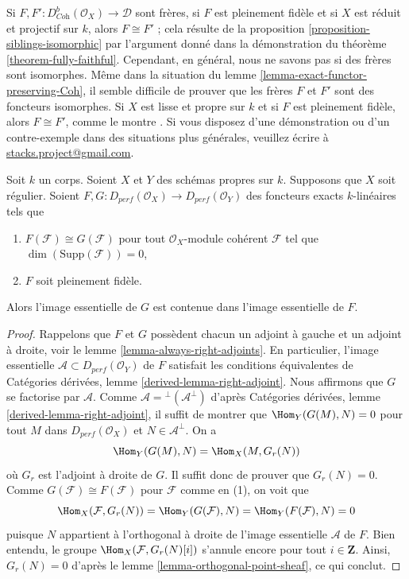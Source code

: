 \begin{remark}
\label{remark-difficult}
Si $F, F' : D^b_{\textit{Coh}}(\mathcal{O}_X) \to \mathcal{D}$ sont frères, si $F$
est pleinement fidèle et si $X$ est réduit et projectif sur $k$, alors
$F \cong F'$ ; cela résulte de la
proposition \ref{proposition-siblings-isomorphic} par l'argument
donné dans la démonstration du théorème \ref{theorem-fully-faithful}.
Cependant, en général, nous ne savons pas si des frères sont isomorphes.
Même dans la situation du lemme \ref{lemma-exact-functor-preserving-Coh},
il semble difficile de prouver que les frères $F$ et $F'$
sont des foncteurs isomorphes. Si $X$ est lisse et propre sur $k$
et si $F$ est pleinement fidèle, alors $F \cong F'$, comme le montre
\cite{Noah}.
Si vous disposez d'une démonstration ou d'un contre-exemple dans des situations plus générales,
veuillez écrire à
\href{mailto:stacks.project@gmail.com}{stacks.project@gmail.com}.
\end{remark}

\begin{lemma}
\label{lemma-two-functors-pre}
Soit $k$ un corps. Soient $X$ et $Y$ des schémas propres sur $k$. Supposons
que $X$ soit régulier. Soient
$F, G : D_{perf}(\mathcal{O}_X) \to D_{perf}(\mathcal{O}_Y)$
des foncteurs exacts $k$-linéaires tels que
\begin{enumerate}
\item $F(\mathcal{F}) \cong G(\mathcal{F})$ pour tout
$\mathcal{O}_X$-module cohérent $\mathcal{F}$ tel que $\dim(\text{Supp}(\mathcal{F})) = 0$,
\item $F$ soit pleinement fidèle.
\end{enumerate}
Alors l'image essentielle de $G$ est contenue dans l'image essentielle
de $F$.
\end{lemma}

\begin{proof}
Rappelons que $F$ et $G$ possèdent chacun un adjoint à gauche et un adjoint à droite, voir le
lemme \ref{lemma-always-right-adjoints}. En particulier,
l'image essentielle $\mathcal{A} \subset D_{perf}(\mathcal{O}_Y)$ de $F$
satisfait les conditions équivalentes de
Catégories dérivées, lemme \ref{derived-lemma-right-adjoint}.
Nous affirmons que $G$ se factorise par $\mathcal{A}$.
Comme $\mathcal{A} = {}^\perp(\mathcal{A}^\perp)$ d'après
Catégories dérivées, lemme \ref{derived-lemma-right-adjoint},
il suffit de montrer que $\Hom_Y(G(M), N) = 0$ pour
tout $M$ dans $D_{perf}(\mathcal{O}_X)$ et $N \in \mathcal{A}^\perp$.
On a
$$
\Hom_Y(G(M), N) = \Hom_X(M, G_r(N))
$$
où $G_r$ est l'adjoint à droite de $G$. Il suffit donc de prouver
que $G_r(N) = 0$. Comme
$G(\mathcal{F}) \cong F(\mathcal{F})$ pour $\mathcal{F}$ comme en (1),
on voit que
$$
\Hom_X(\mathcal{F}, G_r(N)) =
\Hom_Y(G(\mathcal{F}), N) =
\Hom_Y(F(\mathcal{F}), N) = 0
$$
puisque $N$ appartient à l'orthogonal à droite de l'image essentielle $\mathcal{A}$ de $F$.
Bien entendu, le groupe $\Hom_X(\mathcal{F}, G_r(N)[i])$ s'annule encore
pour tout $i \in \mathbf{Z}$. Ainsi, $G_r(N) = 0$ d'après le
lemme \ref{lemma-orthogonal-point-sheaf}, ce qui conclut.
\end{proof}

